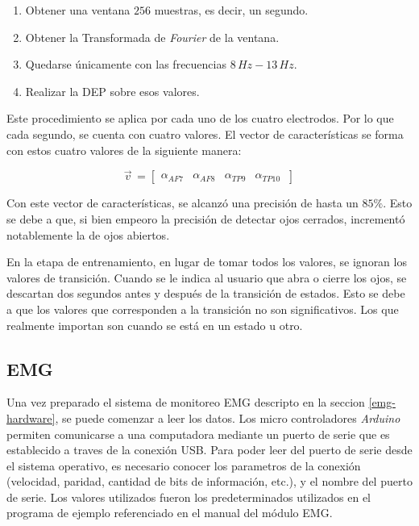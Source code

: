  \begin{enumerate}
 \item Obtener una ventana $256$ muestras, es decir, un segundo.
 \item Obtener la Transformada de \emph{Fourier} de la ventana.
 \item Quedarse únicamente con las frecuencias $8 \, Hz-13 \, Hz$.
 \item Realizar la DEP sobre esos valores.
 \end{enumerate}
 
Este procedimiento se aplica por cada uno de los cuatro electrodos. Por lo que cada segundo, se cuenta con cuatro valores. El vector de características se forma con estos cuatro valores de la siguiente manera:
 
\[
  \vec{v}^{\, }=
  \left[ {\begin{array}{cccc}
   \alpha_{AF7}  & \alpha_{AF8} & \alpha_{TP9} & \alpha_{TP10}  \     \end{array} } \right]
\] 

Con este vector de características, se alcanzó una precisión de hasta un $ 85 \%$. Esto se debe a que, si bien empeoro la precisión de detectar ojos cerrados, incrementó notablemente la de ojos abiertos.
 
En la etapa de entrenamiento, en lugar de tomar todos los valores, se ignoran los valores de transición. Cuando se le indica al usuario que abra o cierre los ojos, se descartan dos segundos antes y después de la transición de estados. Esto se debe a que los valores que corresponden a la transición no son significativos. Los que realmente importan son cuando se está en un estado u otro.
 
\subsection{EMG}

Una vez preparado el sistema de monitoreo EMG descripto en la seccion \ref{emg-hardware}, se puede comenzar a leer los datos. Los micro controladores \emph{Arduino} permiten comunicarse a una computadora mediante un puerto de serie que es establecido a traves de la conexión USB.  Para poder leer del puerto de serie desde el sistema operativo, es necesario conocer los parametros de la conexión (velocidad, paridad, cantidad de bits de información, etc.), y el nombre del puerto de serie. Los valores utilizados fueron los predeterminados utilizados en el programa de ejemplo referenciado en el manual del módulo EMG\cite{olimex-manual}.

